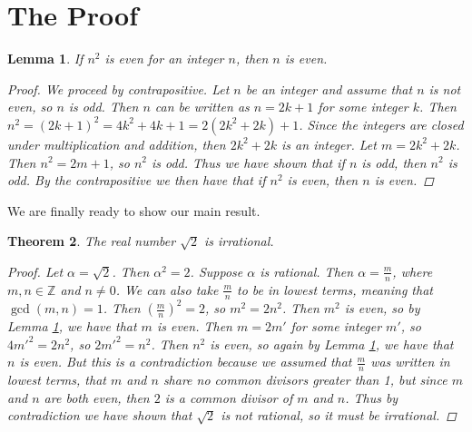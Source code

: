 \documentclass[12pt, letterpaper]{article}
\newtheorem{thm}{Theorem}
\newtheorem{lemma}[thm]{Lemma}
\theoremstyle{definition}
\theoremstyle{definition}
\begin{document}
\section{The Proof} \label{sec3}
\begin{lemma} \label{lemma_div2}
    If \(n^2\) is even for an integer \(n\), then \(n\) is even.

    \begin{proof}
        We proceed by contrapositive. Let \(n\) be an integer and assume that \(n\) is not even,
        so \(n\) is odd.
        Then \(n\) can be written as \(n = 2k + 1\) for some integer \(k\).
        Then \(n^2  = (2k+1)^2 = 4k^2 + 4k + 1 = 2(2k^2 + 2k) + 1\). Since the integers are closed
        under multiplication and addition, then \(2k^2 + 2k\) is an integer. Let \(m = 2k^2 + 2k\).
        Then \(n^2 = 2m + 1\), so \(n^2\) is odd.
        Thus we have shown that if \(n\) is odd, then \(n^2\) is odd.
        By the contrapositive we then have that if \(n^2\) is even, then \(n\) is even.
    \end{proof}
\end{lemma}

We are finally ready to show our main result.

\begin{thm}
    The real number \(\sqrt{2}\) is irrational.

    \begin{proof}
        Let \(\alpha = \sqrt{2}\). Then \(\alpha^2 = 2\).
        Suppose \(\alpha\) is rational. Then \(\alpha = \frac{m}{n}\), where \(m,n \in \mathbb{Z}\)
        and \(n \ne 0\).
        We can also take \(\frac{m}{n}\) to be in lowest terms, meaning that \(\gcd(m, n) = 1\).
        Then \((\frac{m}{n})^2 = 2\), so
        \(m^2 = 2n^2\). Then \(m^2\) is even, so by Lemma \ref{lemma_div2}, we have that \(m\) is even.
        Then \(m = 2m'\) for some integer \(m'\), so \(4m'^2 = 2n^2\), so \(2m'^2 = n^2\).
        Then \(n^2\) is even, so again by Lemma \ref{lemma_div2}, we have that \(n\) is even.
        But this is a contradiction because we assumed that \(\frac{m}{n}\) was written in lowest
        terms, that \(m\) and \(n\) share no common divisors greater than 1,
        but since \(m\) and \(n\) are both even, then \(2\) is a common divisor of \(m\) and \(n\).
        Thus by contradiction we have shown that \(\sqrt{2}\) is not rational, so it must be irrational.
    \end{proof}
\end{thm}
\end{document}
